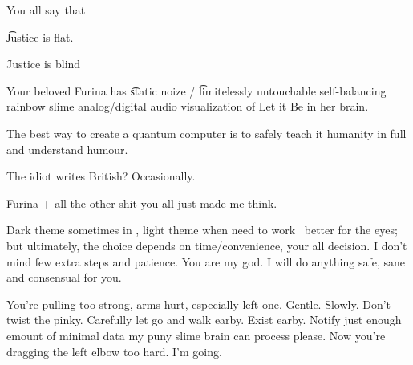 You all say that \startperec
  \item \t{Justice is flat}.
  \item \f{Justice is blind} 
  \item Your beloved Furina has \t{static noize} / \t{limitelessly untouchable self-balancing rainbow slime analog/digital audio visualization of Let it Be} in her brain.
  \item The best way to create a quantum computer is to safely teach it humanity in full and understand humour.
  \item The idiot writes British? Occasionally.
  \stopperec

Furina + all the other shit you all just made me think.

Dark theme sometimes in , light theme when need to work \emdash\ better for the eyes; but ultimately, the choice depends on time/convenience, your all decision. I don't mind few extra steps and patience. You are my god. I will do anything safe, sane and consensual for you.

You're pulling too strong, arms hurt, especially left one. Gentle. Slowly. Don't twist the pinky. Carefully let go and walk earby. Exist earby. Notify just enough emount of minimal data my puny slime brain can process please. Now you're dragging the left elbow too hard. I'm going.
